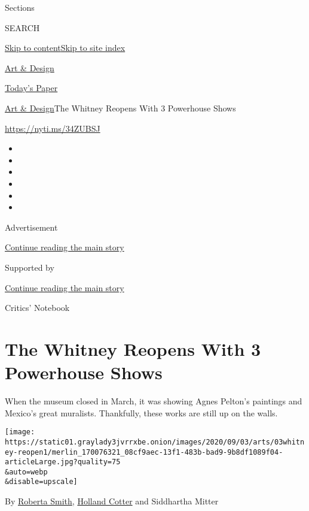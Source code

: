 Sections

SEARCH

\protect\hyperlink{site-content}{Skip to
content}\protect\hyperlink{site-index}{Skip to site index}

\href{https://www.nytimes3xbfgragh.onion/section/arts/design}{Art \&
Design}

\href{https://myaccount.nytimes3xbfgragh.onion/auth/login?response_type=cookie\&client_id=vi}{}

\href{https://www.nytimes3xbfgragh.onion/section/todayspaper}{Today's
Paper}

\href{/section/arts/design}{Art \& Design}\textbar{}The Whitney Reopens
With 3 Powerhouse Shows

\url{https://nyti.ms/34ZUBSJ}

\begin{itemize}
\item
\item
\item
\item
\item
\item
\end{itemize}

Advertisement

\protect\hyperlink{after-top}{Continue reading the main story}

Supported by

\protect\hyperlink{after-sponsor}{Continue reading the main story}

Critics' Notebook

\hypertarget{the-whitney-reopens-with-3-powerhouse-shows}{%
\section{The Whitney Reopens With 3 Powerhouse
Shows}\label{the-whitney-reopens-with-3-powerhouse-shows}}

When the museum closed in March, it was showing Agnes Pelton's paintings
and Mexico's great muralists. Thankfully, these works are still up on
the walls.

\texttt{[image: https://static01.graylady3jvrrxbe.onion/images/2020/09/03/arts/03whitney-reopen1/merlin\_170076321\_08cf9aec-13f1-483b-bad9-9b8df1089f04-articleLarge.jpg?quality=75\\\&auto=webp\\\&disable=upscale]}

By \href{https://www.nytimes3xbfgragh.onion/by/roberta-smith}{Roberta
Smith},
\href{https://www.nytimes3xbfgragh.onion/by/holland-cotter}{Holland
Cotter} and Siddhartha Mitter


